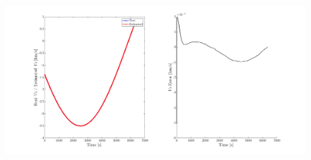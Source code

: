 \begin{figure}[H]
    \centering
    \includegraphics[width=\textwidth]{Figures/VZ_error-5observers-50km.png}
    \caption{}
    \label{fig: vzerror-50-5}
\end{figure}


